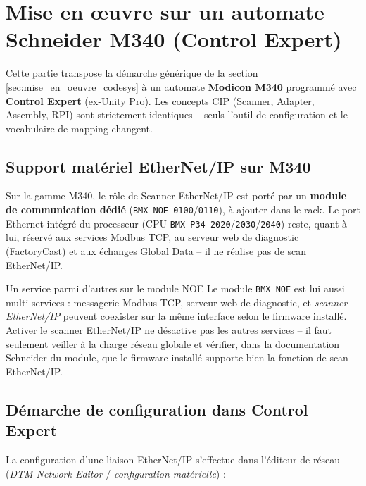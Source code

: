 \section{Mise en \oe uvre sur un automate Schneider M340 (Control Expert)}
\label{sec:mise_en_oeuvre_m340}

Cette partie transpose la démarche générique de la section \ref{sec:mise_en_oeuvre_codesys} à un automate \textbf{Modicon M340} programmé avec \textbf{Control Expert} (ex-Unity Pro). Les concepts CIP (Scanner, Adapter, Assembly, RPI) sont strictement identiques -- seuls l'outil de configuration et le vocabulaire de mapping changent.

\subsection{Support matériel EtherNet/IP sur M340}
Sur la gamme M340, le rôle de Scanner EtherNet/IP est porté par un \textbf{module de communication dédié} (\texttt{BMX~NOE~0100}/\texttt{0110}), à ajouter dans le rack. Le port Ethernet intégré du processeur (CPU \texttt{BMX~P34~2020}/\texttt{2030}/\texttt{2040}) reste, quant à lui, réservé aux services Modbus TCP, au serveur web de diagnostic (FactoryCast) et aux échanges Global Data -- il ne réalise pas de scan EtherNet/IP.

\begin{UPSTIinfor}{Un service parmi d'autres sur le module NOE}
    Le module \texttt{BMX~NOE} est lui aussi multi-services : messagerie Modbus TCP, serveur web de diagnostic, et \emph{scanner EtherNet/IP} peuvent coexister sur la même interface selon le firmware installé. Activer le scanner EtherNet/IP ne désactive pas les autres services -- il faut seulement veiller à la charge réseau globale et vérifier, dans la documentation Schneider du module, que le firmware installé supporte bien la fonction de scan EtherNet/IP.
\end{UPSTIinfor}

\subsection{Démarche de configuration dans Control Expert}
La configuration d'une liaison EtherNet/IP s'effectue dans l'éditeur de réseau (\emph{DTM Network Editor} / \emph{configuration matérielle}) :

